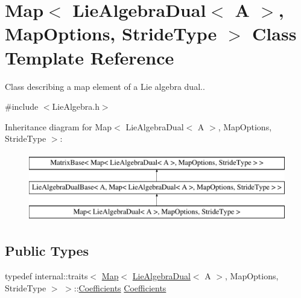 \hypertarget{class_map_3_01_lie_algebra_dual_3_01_a_01_4_00_01_map_options_00_01_stride_type_01_4}{}\section{Map$<$ Lie\+Algebra\+Dual$<$ A $>$, Map\+Options, Stride\+Type $>$ Class Template Reference}
\label{class_map_3_01_lie_algebra_dual_3_01_a_01_4_00_01_map_options_00_01_stride_type_01_4}


Class describing a map element of a Lie algebra dual..  




{\ttfamily \#include $<$Lie\+Algebra.\+h$>$}

Inheritance diagram for Map$<$ Lie\+Algebra\+Dual$<$ A $>$, Map\+Options, Stride\+Type $>$\+:\begin{figure}[H]
\begin{center}
\leavevmode
\includegraphics[height=3.000000cm]{class_map_3_01_lie_algebra_dual_3_01_a_01_4_00_01_map_options_00_01_stride_type_01_4}
\end{center}
\end{figure}
\subsection*{Public Types}
\begin{DoxyCompactItemize}
\item 
typedef internal\+::traits$<$ \hyperlink{class_map_3_01_lie_algebra_dual_3_01_a_01_4_00_01_map_options_00_01_stride_type_01_4_a343da7ed6d4069324cd174c8fa51a43f}{Map}$<$ \hyperlink{class_lie_algebra_dual}{Lie\+Algebra\+Dual}$<$ A $>$, Map\+Options, Stride\+Type $>$ $>$\+::\hyperlink{class_map_3_01_lie_algebra_dual_3_01_a_01_4_00_01_map_options_00_01_stride_type_01_4_ab39602ca662c12f4aa9031d05157fb73}{Coefficients} \hyperlink{class_map_3_01_lie_algebra_dual_3_01_a_01_4_00_01_map_options_00_01_stride_type_01_4_ab39602ca662c12f4aa9031d05157fb73}{Coefficients}
\end{DoxyCompactItemize}
